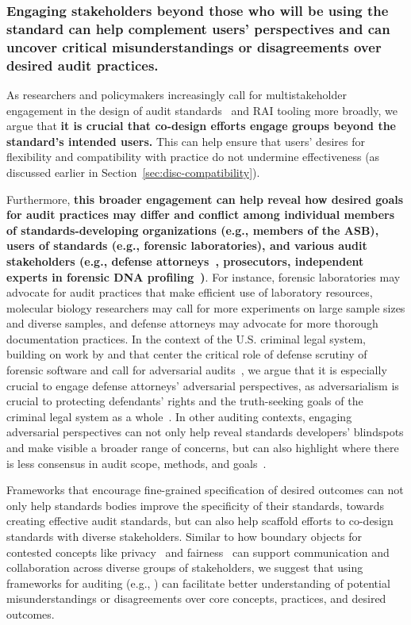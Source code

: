 \subsubsection{Engaging stakeholders beyond those who will be using the standard can help complement users’ perspectives and can uncover critical misunderstandings or disagreements over desired audit practices.}
\label{sec:disc-design-codesign}
As researchers and policymakers increasingly call for multistakeholder engagement in the design of audit standards~\cite{schor2024mind, aistandardshub} and RAI tooling more broadly, we argue that \textbf{it is crucial that co-design efforts engage groups beyond the standard’s intended users.} This can help ensure that users’ desires for flexibility and compatibility with practice do not undermine effectiveness (as discussed earlier in Section~\ref{sec:disc-compatibility}). 

Furthermore, \textbf{this broader engagement can help reveal how desired goals for audit practices may differ and conflict among individual members of standards-developing organizations (e.g., members of the ASB), users of standards (e.g., forensic laboratories), and various audit stakeholders (e.g., defense attorneys~\cite{jin2024beyond, abebe2022adversarial}, prosecutors, independent experts in forensic DNA profiling~\cite{krane2022using, butler2024dna})}. For instance, forensic laboratories may advocate for audit practices that make efficient use of laboratory resources,  molecular biology researchers may call for more experiments on large sample sizes and diverse samples, and defense attorneys may advocate for more thorough documentation practices. In the context of the U.S. criminal legal system, building on work by \citet{abebe2022adversarial} and \citet{jin2024beyond} that center the critical role of defense scrutiny of forensic software and call for adversarial audits~\cite{abebe2022adversarial}, we argue that it is especially crucial to engage defense attorneys' adversarial perspectives, as adversarialism is crucial to protecting defendants’ rights and the truth-seeking goals of the criminal legal system as a whole~\cite{abebe2022adversarial}. In other auditing contexts, engaging adversarial perspectives can not only help reveal standards developers' blindspots and make visible a broader range of concerns, but can also highlight where there is less consensus in audit scope, methods, and goals~\cite{geiger2024making, raji2022outsider, birhane2024ai}.


Frameworks that encourage fine-grained specification of desired outcomes can not only help standards bodies improve the specificity of their standards, towards creating effective audit standards, but can also help scaffold efforts to co-design standards with diverse stakeholders. Similar to how boundary objects for contested concepts like privacy~\cite{mulligan2016privacy} and fairness~\cite{mulligan2019thing} can support communication and collaboration across diverse groups of stakeholders, we suggest that using frameworks for auditing (e.g., \cite{abebe2022adversarial, ojewale2025towards, raji2020closing}) can facilitate better understanding of potential misunderstandings or disagreements over core concepts, practices, and desired outcomes. 
